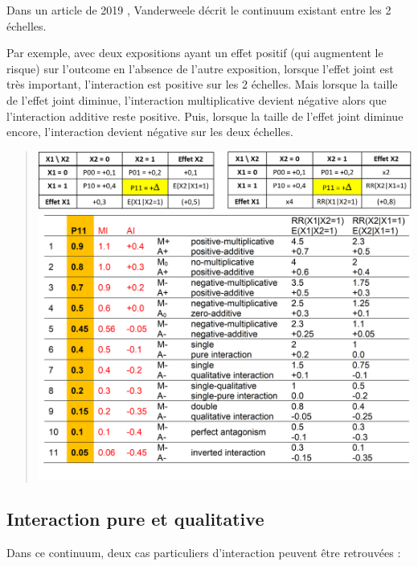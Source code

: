 \documentclass[
]{book}
\begin{document}
Dans un article de 2019 \citet{vanderweele_interaction_2019}, Vanderweele décrit le continuum existant entre les 2 échelles.

Par exemple, avec deux expositions ayant un effet positif (qui augmentent le risque) sur l'outcome en l'absence de l'autre exposition, lorsque l'effet joint est très important, l'interaction est positive sur les 2 échelles. Mais lorsque la taille de l'effet joint diminue, l'interaction multiplicative devient négative alors que l'interaction additive reste positive. Puis, lorsque la taille de l'effet joint diminue encore, l'interaction devient négative sur les deux échelles.

\begin{quote}
\includegraphics[width=1\textwidth,height=\textheight]{img/Image6.png}
\includegraphics[width=1\textwidth,height=\textheight]{img/Image7.png}
\end{quote}

\hypertarget{interaction-pure-et-qualitative}{%
\subsection*{Interaction pure et qualitative}\label{interaction-pure-et-qualitative}}

Dans ce continuum, deux cas particuliers d'interaction peuvent être retrouvées :
\end{document}
